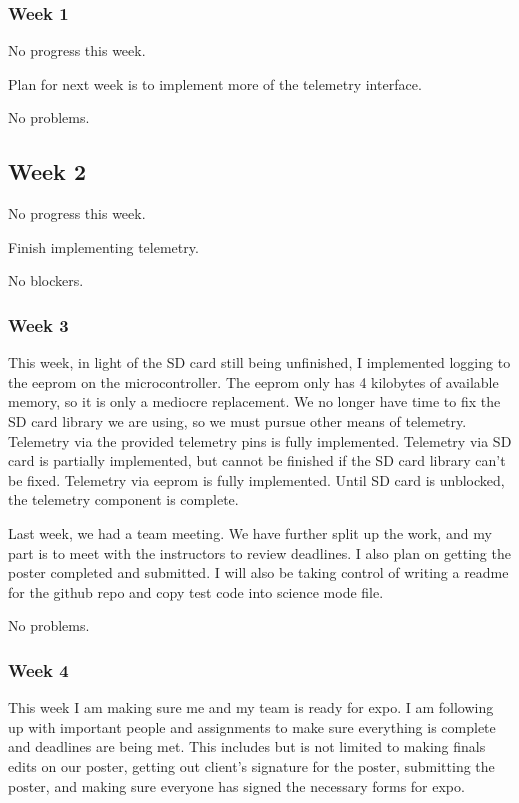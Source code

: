 \subsubsection{Week 1}
No progress this week.

Plan for next week is to implement more of the telemetry interface.

No problems.

\subsection{Week 2}
No progress this week.

Finish implementing telemetry.

No blockers.

\subsubsection{Week 3}
This week, in light of the SD card still being unfinished, I implemented logging to the eeprom on the microcontroller. The eeprom only has 4 kilobytes of available memory, so it is only a mediocre replacement. We no longer have time to fix the SD card library we are using, so we must pursue other means of telemetry. Telemetry via the provided telemetry pins is fully implemented. Telemetry via SD card is partially implemented, but cannot be finished if the SD card library can't be fixed. Telemetry via eeprom is fully implemented. Until SD card is unblocked, the telemetry component is complete.

Last week, we had a team meeting. We have further split up the work, and my part is to meet with the instructors to review deadlines. I also plan on getting the poster completed and submitted. I will also be taking control of writing a readme for the github repo and copy test code into science mode file.

No problems.

\subsubsection{Week 4}
This week I am making sure me and my team is ready for expo. I am following up with important people and assignments to make sure everything is complete and deadlines are being met. This includes but is not limited to making finals edits on our poster, getting out client's signature for the poster, submitting the poster, and making sure everyone has signed the necessary forms for expo.

